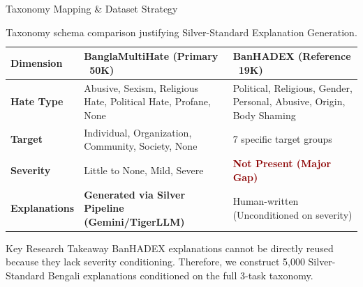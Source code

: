 \documentclass[10pt, aspectratio=169]{beamer}
\begin{document}
\begin{frame}{Taxonomy Mapping \& Dataset Strategy}
    \begin{table}
        \centering
        \scriptsize
        \begin{tabular}{lp{4cm}p{4cm}}
            \toprule
            \textbf{Dimension} & \textbf{BanglaMultiHate (Primary ~50K)} & \textbf{BanHADEX (Reference ~19K)} \\
            \midrule
            \textbf{Hate Type} & Abusive, Sexism, Religious Hate, Political Hate, Profane, None & Political, Religious, Gender, Personal, Abusive, Origin, Body Shaming \\
            \textbf{Target} & Individual, Organization, Community, Society, None & 7 specific target groups \\
            \textbf{Severity} & Little to None, Mild, Severe & \textcolor{DarkRed}{\textbf{Not Present (Major Gap)}} \\
            \textbf{Explanations} & \textcolor{AccentBlue}{\textbf{Generated via Silver Pipeline (Gemini/TigerLLM)}} & Human-written (Unconditioned on severity) \\
            \bottomrule
        \end{tabular}
        \caption{Taxonomy schema comparison justifying Silver-Standard Explanation Generation.}
    \end{table}
    
    \begin{alertblock}{Key Research Takeaway}
        BanHADEX explanations cannot be directly reused because they lack severity conditioning. Therefore, we construct 5,000 Silver-Standard Bengali explanations conditioned on the full 3-task taxonomy.
    \end{alertblock}
\end{frame}
\end{document}
